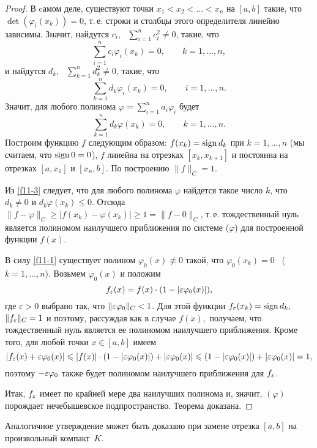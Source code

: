 \begin{proof}
В cамом деле, существуют точки $x_1< x_2< \ldots< x_n$ на $[a,b]$ такие, что
$\det (\varphi_i(x_k))=0$, т.\,е. строки и столбцы этого определителя линейно
зависимы. Значит, найдутся $c_i$,~ $\sum\limits_{i=1}^n c_i^2\ne 0$, такие, что
 \begin{equation}\label{f11-1}
 \sum\limits_{i=1}^n c_i \varphi_i(x_k)= 0,\qquad k=1,\ldots,n,
 \end{equation}
и найдутся $d_k$,~ $\sum\limits_{k=1}^n d_k^2 \ne 0$, такие, что
 \begin{equation}\label{f11-2}
 \sum\limits_{k=1}^n d_k \varphi_i(x_k)=0,\qquad i=1,\ldots,n.
 \end{equation}
Значит, для любого полинома {$\varphi=\sum\limits_{i=1}^n a_i \varphi_i$} будет
 \begin{equation}\label{f11-3}
 \sum\limits_{k=1}^n d_k\varphi(x_k)=0,\qquad k=1,\ldots,n.
 \end{equation}
Построим функцию $f$ следующим образом: $f(x_k)={\rm sign \, } d_k$ при $k=1,\ldots,n$
(мы считаем, что ${\rm sign \, } 0=0$), $f$ линейна на отрезках
$[x_k,x_{k+1}]$ и постоянна на отрезках $[a,x_1]$ и $[x_n,b]$. По построению {$\|f\|_C=1$}.

Из \eqref{f11-3} следует, что для любого полинома $\varphi$ найдется такое число
$k$, что $d_k\ne0$ и $d_k\varphi(x_k)\le0$. Отсюда
$\|f-\varphi\|_C \ge |f(x_k)-\varphi(x_k)| \ge 1 = \|f-0\|_C$, т.\,е.
тождественный нуль является полиномом наилучшего приближения по системе
($\varphi$) для построенной функции $f(x)$.

{В силу \eqref{f11-1} существует полином $\varphi_0(x) \not\equiv 0$ такой,
что $\varphi_0(x_k)=0$~ ($k=1,\ldots,n$).} Возьмем
$\varphi_0(x)$ {и положим}
$$
f_\varepsilon(x) = f(x)\cdot(1-|\varepsilon\varphi_0(x)|),
$$
где $\varepsilon>0$ выбрано так, что $\|\varepsilon\varphi_0\|_C < 1$.
Для этой функции {$f_\varepsilon(x_k)={\rm sign \, }{d_k},$
$\|f_\varepsilon\|_C=1$ и поэтому}, рассуждая как в случае $f(x),$ получаем, что
тождественный нуль является ее
полиномом наилучшего приближения. Кроме того, для любой точки $x\in [a,b]$ имеем
$$
|f_\varepsilon(x)+\varepsilon\varphi_0(x)| \leqslant |f(x)|\cdot(1-|\varepsilon\varphi_0(x)|) + |\varepsilon\varphi_0(x)| \leqslant
(1-|\varepsilon\varphi_0(x)|) + |\varepsilon\varphi_0(x)| = 1,
$$
поэтому $-\varepsilon\varphi_0$ также будет полиномом наилучшего приближения для $f_\varepsilon$.

Итак, $f_\varepsilon$ имеет по крайней мере два наилучших полинома и, значит,
$(\varphi)$ порождает нечебышевское подпространство. Теорема доказана.
\end{proof}

\begin{Remark}
Аналогичное утверждение может быть доказано при замене отрезка
$[a,b]$ на произвольный компакт~$K$.
\end{Remark}
